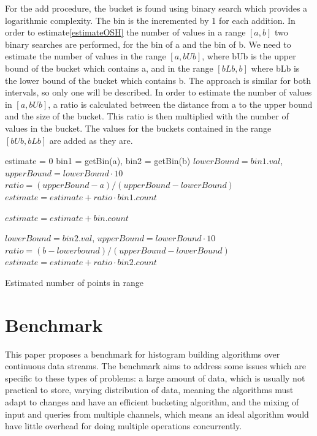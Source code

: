 \documentclass[12pt]{article}
\begin{document}
	For the add procedure, the bucket is found using binary search which 
	provides a logarithmic complexity. The bin is the incremented by 1 
	for each addition. In order to estimate\ref{estimateOSH} the number of values in a range $ [a, b] $ 
	two binary searches are performed, for the bin of a and the bin of b. We 
	need to estimate the number of values in the range $[a, bUb]$, where bUb is the upper
	bound of the bucket which contains a, and in the range $[bLb, b]$ where bLb is the
	lower bound of the bucket which contains b. The approach is similar for both 
	intervals, so only one will be described. In order to estimate the number 
	of values in $[a, bUb]$, a ratio is calculated between the distance from 
	a to the upper bound and the size of the bucket. This ratio is then multiplied 
	with the number of values in the bucket. The values for the buckets contained 
	in the range $ [bUb, bLb] $ are added as they are.
	
	\begin{algorithm}[H]
		\label{estimateOSH}

		estimate = 0\;
		bin1 = getBin(a), bin2 = getBin(b)\;
		$lowerBound = bin1.val$, $upperBound = lowerBound \cdot 10$\;
		$ratio = (upperBound - a) / (upperBound - lowerBound)$\;
		$estimate = estimate + ratio \cdot bin1.count$\;

		 {
			$estimate = estimate + bin.count$
		}

		$lowerBound = bin2.val$, $upperBound = lowerBound \cdot 10$\;
		$ratio = (b - lowerbound) / (upperBound - lowerBound)$\;
		$estimate = estimate + ratio \cdot bin2.count$\;

		\caption{Estimated number of points in range}
	\end{algorithm}

	\section{Benchmark}
	This paper proposes a benchmark for histogram building algorithms 
	over continuous data streams. The benchmark aims to address some 
	issues which are specific to these types of problems: a large amount 
	of data, which is usually not practical to store, varying distribution 
	of data, meaning the algorithms must adapt to changes and have an 
	efficient bucketing algorithm, and the mixing of input and queries from 
	multiple channels, which means an ideal algorithm would have little overhead 
	for doing multiple operations concurrently.
\end{document}
